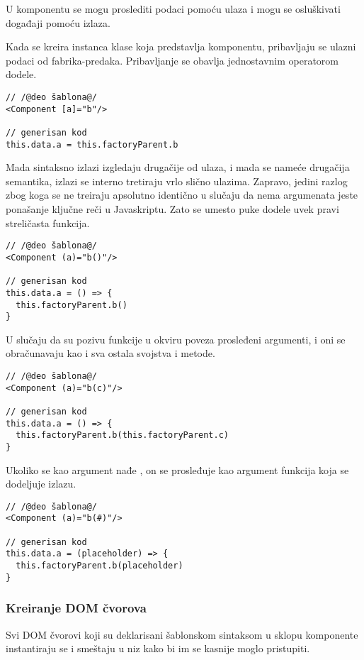U komponentu se mogu proslediti podaci pomoću ulaza i mogu se osluškivati događaji pomoću izlaza.

Kada se kreira instanca klase koja predstavlja komponentu, pribavljaju se ulazni podaci od fabrika-predaka.
Pribavljanje se obavlja jednostavnim operatorom dodele.

\begin{lstlisting}
// /@deo šablona@/
<Component [a]="b"/>

// generisan kod
this.data.a = this.factoryParent.b
\end{lstlisting}

Mada sintaksno izlazi izgledaju drugačije od ulaza, i mada se nameće drugačija semantika, izlazi se interno tretiraju vrlo slično ulazima.
Zapravo, jedini razlog zbog koga se ne treiraju apsolutno identično u slučaju da nema argumenata jeste ponašanje ključne reči  u Javaskriptu.
Zato se umesto puke dodele uvek pravi streličasta funkcija.

\begin{lstlisting}
// /@deo šablona@/
<Component (a)="b()"/>

// generisan kod
this.data.a = () => {
  this.factoryParent.b()
}
\end{lstlisting}

U slučaju da su pozivu funkcije u okviru poveza prosleđeni argumenti, i oni se obračunavaju kao i sva ostala svojstva i metode.

\begin{lstlisting}
// /@deo šablona@/
<Component (a)="b(c)"/>

// generisan kod
this.data.a = () => {
  this.factoryParent.b(this.factoryParent.c)
}
\end{lstlisting}

Ukoliko se kao argument nađe \code{\#}, on se prosleđuje kao argument funkcija koja se dodeljuje izlazu.

\begin{lstlisting}
// /@deo šablona@/
<Component (a)="b(#)"/>

// generisan kod
this.data.a = (placeholder) => {
  this.factoryParent.b(placeholder)
}
\end{lstlisting}

\subsubsection{Kreiranje DOM čvorova}
\label{subsubsec:init-part-4}

Svi DOM čvorovi koji su deklarisani šablonskom sintaksom u sklopu komponente instantiraju se i smeštaju u niz kako bi im se kasnije moglo pristupiti.

